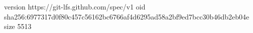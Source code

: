 version https://git-lfs.github.com/spec/v1
oid sha256:6977317d0f80c457c56162bc6766af4d6295ad58a2bf9ed7bcc30b46db2eb04e
size 5513
